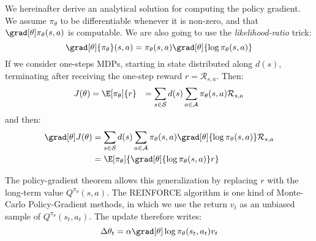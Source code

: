 {{{{				
				We hereinafter derive an analytical solution for computing the policy gradient. We assume $\pi_\theta$ to be differentiable whenever it is non-zero, and that $\grad[\theta]\pi_\theta(s,a)$ is computable. We are also going to use the \emph{likelihood-ratio} trick: 
					\begin{equation}
						\grad[\theta]{\pi_\theta}(s,a) = \pi_\theta(s,a) \grad[\theta]{\log{\pi_\theta(s,a)}}
					\end{equation}
					If we consider one-steps MDPs, starting in state distributed along $d(s)$, terminating after receiving the one-step reward $r=\mathcal{R}_{s,a}$. Then: 
					\begin{equation}
						\begin{aligned}
							J(\theta) &= \E[\pi_\theta]{r}
								      &= \sum_{s\in\mathcal{S}} d(s) \sum_{a\in\mathcal{A}}  \pi_\theta(s,a) \mathcal{R}_{s,a} 
						\end{aligned}
					\end{equation}
					and then:
					\begin{equation}
						\begin{aligned}
							\grad[\theta]J(\theta) &= \sum_{s\in\mathcal{S}} d(s) \sum_{a\in\mathcal{A}} \pi_\theta(s,a) \grad[\theta]{\log{\pi_\theta(s,a)}}\mathcal{R}_{s,a}\\
											&= \E[\pi_\theta]{\grad[\theta]{\log{\pi_\theta(s,a)}}r}
						\end{aligned}
					\end{equation}
				
				The policy-gradient theorem \cite{sutton2000policy} allows this generalization by replacing $r$ with the long-term value $Q^{\pi_\theta}(s,a)$. The REINFORCE algorithm \cite{williams1992simple} is one kind of Monte-Carlo Policy-Gradient methods, in which we use the return $v_t$ as an unbiased sample of $Q^{\pi_\theta}(s_t,a_t)$. The update therefore writes:
					\begin{equation}
						\Delta\theta_t = \alpha \grad[\theta]\log{\pi_{\theta}(s_t,a_t)}v_t
					\end{equation}


}}}}
